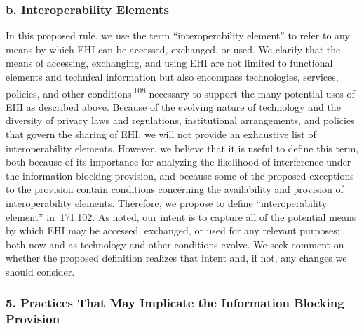 \documentclass[twoside,11pt]{article}
\begin{document}
          \subsubsection{b. Interoperability Elements}

          In this proposed rule, we use the term “interoperability element” to refer to any means by which EHI can be accessed, exchanged, or used. We clarify that the means of accessing, exchanging, and using EHI are not limited to functional elements and technical information but also encompass technologies, services, policies, and other conditions \textsuperscript{108}
             necessary to support the many potential uses of EHI as described above. Because of the evolving nature of technology and the diversity of privacy laws and regulations, institutional arrangements, and policies that govern the sharing of EHI, we will not provide an exhaustive list of interoperability elements. However, we believe that it is useful to define this term, both because of its importance for analyzing the likelihood of interference under the information blocking provision, and because some of the proposed exceptions to the provision contain conditions concerning the availability and provision of interoperability elements. Therefore, we propose to define “interoperability element” in \textsection{} 171.102. As noted, our intent is to capture all of the potential means by which EHI may be accessed, exchanged, or used for any relevant purposes; both now and as technology and other conditions evolve. We seek comment on whether the proposed definition realizes that intent and, if not, any changes we should consider.




          \subsubsection{5. Practices That May Implicate the Information Blocking Provision}
\end{document}
